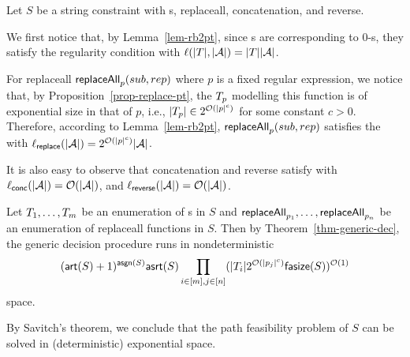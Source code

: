 



%
Let $S$ be a string constraint with \FT{}s, replaceall, concatenation, and reverse.

We first notice that, by Lemma~\ref{lem-rb2pt}, since \FT{}s are corresponding to 0-\RBPPT{}s, they satisfy the regularity condition \prerec{} with  $\ell(|T|, |\mathcal{A}|) = |T||\mathcal{A}|$. 

For replaceall  $\mathsf{replaceAll}_{p}(sub, rep)$ where $p$ is a fixed regular expression, we notice that, by Proposition~\ref{prop-replace-pt}, the \PT{} $T_p$ modelling this function is of exponential size in that of $p$, i.e., $|T_p| \in 2^{\mathcal{O}(|p|^c)}$ for some constant $c > 0$. Therefore, according to Lemma~\ref{lem-rb2pt}, $\mathsf{replaceAll}_{p}(sub, rep)$ satisfies the  \prerec{} with  $\ell_{\sf replace}(|\mathcal{A}|) =  2^{\mathcal{O}(|p|^c)} |\mathcal{A}|$.

It is also easy to observe that concatenation and reverse satisfy  \prerec{} with  $\ell_{\sf conc}(|\mathcal{A}|) = \mathcal{O}(|\mathcal{A}|)$, and $\ell_{\sf reverse}(|\mathcal{A}|) = \mathcal{O}(|\mathcal{A}|)$. 

Let $T_1, \ldots, T_m$ be an enumeration of  \FT{}s in $S$ and $\mathsf{replaceAll}_{p_1}, \ldots, \mathsf{replaceAll}_{p_n}$  be an enumeration of replaceall functions in $S$. Then by Theorem~\ref{thm-generic-dec}, 
the generic decision procedure runs in nondeterministic  
$$(\mathsf{art}(S)+1)^{\mathsf{asgn}(S)} \mathsf{asrt}(S) \prod \limits_{i \in [m], j \in [n]} (|T_i| 2^{\mathcal{O}(|p_j|^c)} \mathsf{fasize}(S))^{\mathcal{O}(1)}$$
 space. 

By Savitch's theorem, we conclude that the path feasibility problem of $S$ can be solved in (deterministic) exponential space.
%
%



